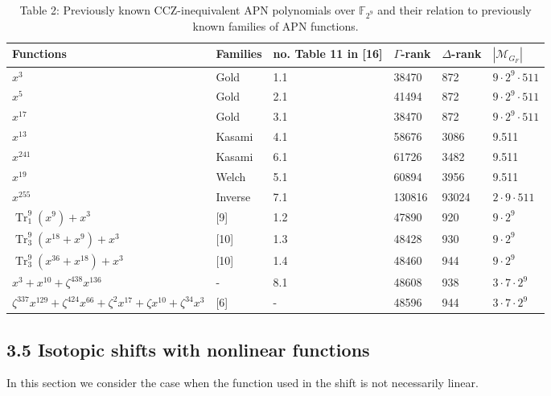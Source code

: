 \documentclass[10pt]{article}
\begin{document}
\begin{table}[h]
\begin{center}
\captionsetup{labelformat=empty}
\caption{Table 2: Previously known CCZ-inequivalent APN polynomials over $\mathbb{F}_{2^{9}}$ and their relation to previously known families of APN functions.}
\begin{tabular}{|l|l|l|l|l|l|}
\hline
Functions & Families & no. Table 11 in [16] & $\Gamma$-rank & $\Delta$-rank & $\left|\mathscr{M}_{G_{F}}\right|$ \\
\hline
$x^{3}$ & Gold & 1.1 & 38470 & 872 & $9 \cdot 2^{9} \cdot 511$ \\
\hline
$x^{5}$ & Gold & 2.1 & 41494 & 872 & $9 \cdot 2^{9} \cdot 511$ \\
\hline
$x^{17}$ & Gold & 3.1 & 38470 & 872 & $9 \cdot 2^{9} \cdot 511$ \\
\hline
$x^{13}$ & Kasami & 4.1 & 58676 & 3086 & 9.511 \\
\hline
$x^{241}$ & Kasami & 6.1 & 61726 & 3482 & 9.511 \\
\hline
$x^{19}$ & Welch & 5.1 & 60894 & 3956 & 9.511 \\
\hline
$x^{255}$ & Inverse & 7.1 & 130816 & 93024 & $2 \cdot 9 \cdot 511$ \\
\hline
$\operatorname{Tr}_{1}^{9}\left(x^{9}\right)+x^{3}$ & [9] & 1.2 & 47890 & 920 & $9 \cdot 2^{9}$ \\
\hline
$\operatorname{Tr}_{3}^{9}\left(x^{18}+x^{9}\right)+x^{3}$ & [10] & 1.3 & 48428 & 930 & $9 \cdot 2^{9}$ \\
\hline
$\operatorname{Tr}_{3}^{9}\left(x^{36}+x^{18}\right)+x^{3}$ & [10] & 1.4 & 48460 & 944 & $9 \cdot 2^{9}$ \\
\hline
$x^{3}+x^{10}+\zeta^{438} x^{136}$ & - & 8.1 & 48608 & 938 & $3 \cdot 7 \cdot 2^{9}$ \\
\hline
$\zeta^{337} x^{129}+\zeta^{424} x^{66}+\zeta^{2} x^{17}+\zeta x^{10}+\zeta^{34} x^{3}$ & [6] & - & 48596 & 944 & $3 \cdot 7 \cdot 2^{9}$ \\
\hline
\end{tabular}
\end{center}
\end{table}

\subsection*{3.5 Isotopic shifts with nonlinear functions}
In this section we consider the case when the function used in the shift is not necessarily linear.
\end{document}
